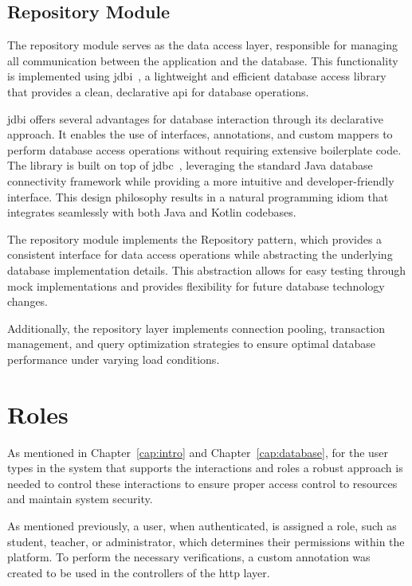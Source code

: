 \subsection{Repository Module}
The repository module serves as the data access layer, responsible for managing all communication between the application and the database. This functionality is implemented using \ac{jdbi}~\cite{jdbi}, a lightweight and efficient database access library that provides a clean, declarative \acs{api} for database operations.

\ac{jdbi} offers several advantages for database interaction through its declarative approach. It enables the use of interfaces, annotations, and custom mappers to perform database access operations without requiring extensive boilerplate code. The library is built on top of \ac{jdbc}~\cite{jdbc}, leveraging the standard Java database connectivity framework while providing a more intuitive and developer-friendly interface. This design philosophy results in a natural programming idiom that integrates seamlessly with both Java and Kotlin codebases.

The repository module implements the Repository pattern, which provides a consistent interface for data access operations while abstracting the underlying database implementation details. This abstraction allows for easy testing through mock implementations and provides flexibility for future database technology changes.

Additionally, the repository layer implements connection pooling, transaction management, and query optimization strategies to ensure optimal database performance under varying load conditions.

\section{Roles} \label{sec:roles}
As mentioned in Chapter~\ref{cap:intro} and Chapter~\ref{cap:database}, for the user types in the system that supports the interactions and roles a robust approach is needed to control these interactions to ensure proper access control to resources and maintain system security.

As mentioned previously, a user, when authenticated, is assigned a role, such as student, teacher, or administrator, which determines their permissions within the platform. To perform the necessary verifications, a custom annotation was created to be used in the controllers of the \acs{http} layer.


